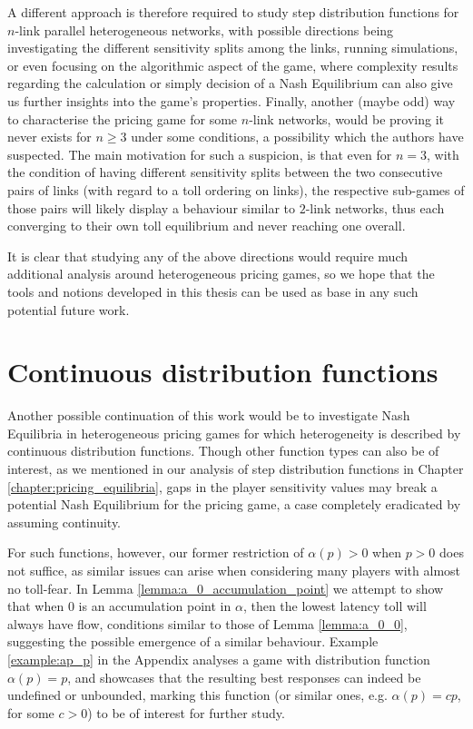 \documentclass[10pt,a4paper]{book}
\theoremstyle{definition}
\theoremstyle{comment}
\begin{document}
A different approach is therefore required to study step distribution functions for $n$-link parallel heterogeneous networks, with possible directions being investigating the different sensitivity splits among the links, running simulations, or even focusing on the algorithmic aspect of the game, where complexity results regarding the calculation or simply decision of a Nash Equilibrium can also give us further insights into the game's properties.
Finally, another (maybe odd) way to characterise the pricing game for some $n$-link networks, would be proving it never exists for $n \ge 3$ under some conditions, a possibility which the authors have suspected.
The main motivation for such a suspicion, is that even for $n = 3$, with the condition of having different sensitivity splits between the two consecutive pairs of links (with regard to a toll ordering on links), the respective sub-games of those pairs will likely display a behaviour similar to $2$-link networks, thus each converging to their own toll equilibrium and never reaching one overall.

It is clear that studying any of the above directions would require much additional analysis around heterogeneous pricing games, so we hope that the tools and notions developed in this thesis can be used as base in any such potential future work.

\section*{Continuous distribution functions}

Another possible continuation of this work would be to investigate Nash Equilibria in heterogeneous pricing games for which heterogeneity is described by continuous distribution functions.
Though other function types can also be of interest, as we mentioned in our analysis of step distribution functions in Chapter \ref{chapter:pricing_equilibria}, gaps in the player sensitivity values may break a potential Nash Equilibrium for the pricing game, a case completely eradicated by assuming continuity.

For such functions, however, our former restriction of $\alpha(p) > 0$ when $p > 0$ does not suffice, as similar issues can arise when considering many players with almost no toll-fear.
In Lemma \ref{lemma:a_0_accumulation_point} we attempt to show that when $0$ is an accumulation point in $\alpha$, then the lowest latency toll will always have flow, conditions similar to those of Lemma \ref{lemma:a_0_0}, suggesting the possible emergence of a similar behaviour.
Example \ref{example:ap_p} in the Appendix analyses a game with distribution function $\alpha(p) = p$, and showcases that the resulting best responses can indeed be undefined or unbounded, marking this function (or similar ones, e.g.  $\alpha(p) = cp$, for some $c > 0$) to be of interest for further study.
\end{document}
